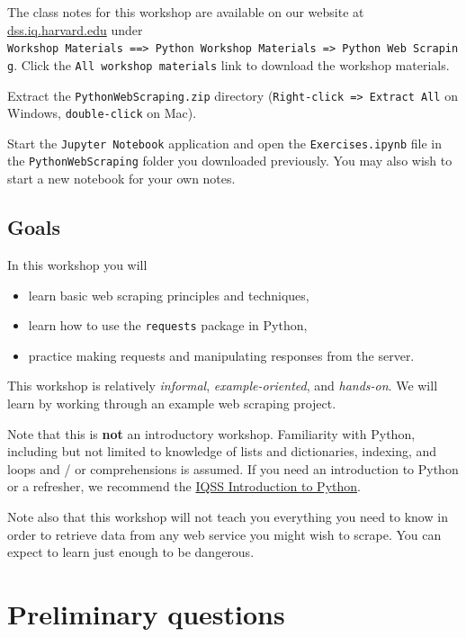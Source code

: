 \documentclass[]{book}
\providecommand{\tightlist}{%
  \setlength{\itemsep}{0pt}\setlength{\parskip}{0pt}}
\begin{document}
The class notes for this workshop are available on our website at
\href{https://dss.iq.harvard.edu}{dss.iq.harvard.edu} under
\texttt{Workshop\ Materials\ ==\textgreater{}\ Python\ Workshop\ Materials\ =\textgreater{}\ Python\ Web\ Scraping}.
Click the \texttt{All\ workshop\ materials} link to download the
workshop materials.

Extract the \texttt{PythonWebScraping.zip} directory
(\texttt{Right-click\ =\textgreater{}\ Extract\ All} on Windows,
\texttt{double-click} on Mac).

Start the \texttt{Jupyter\ Notebook} application and open the
\texttt{Exercises.ipynb} file in the \texttt{PythonWebScraping} folder
you downloaded previously. You may also wish to start a new notebook for
your own notes.

\subsection{Goals}\label{goals-5}

In this workshop you will

\begin{itemize}
\tightlist
\item
  learn basic web scraping principles and techniques,
\item
  learn how to use the \texttt{requests} package in Python,
\item
  practice making requests and manipulating responses from the server.
\end{itemize}

This workshop is relatively \emph{informal}, \emph{example-oriented},
and \emph{hands-on}. We will learn by working through an example web
scraping project.

Note that this is \textbf{not} an introductory workshop. Familiarity
with Python, including but not limited to knowledge of lists and
dictionaries, indexing, and loops and / or comprehensions is assumed. If
you need an introduction to Python or a refresher, we recommend the
\href{https://dss.iq.harvard.edu/workshop-materials\#widget-0}{IQSS
Introduction to Python}.

Note also that this workshop will not teach you everything you need to
know in order to retrieve data from any web service you might wish to
scrape. You can expect to learn just enough to be dangerous.

\section{Preliminary questions}\label{preliminary-questions}
\end{document}
